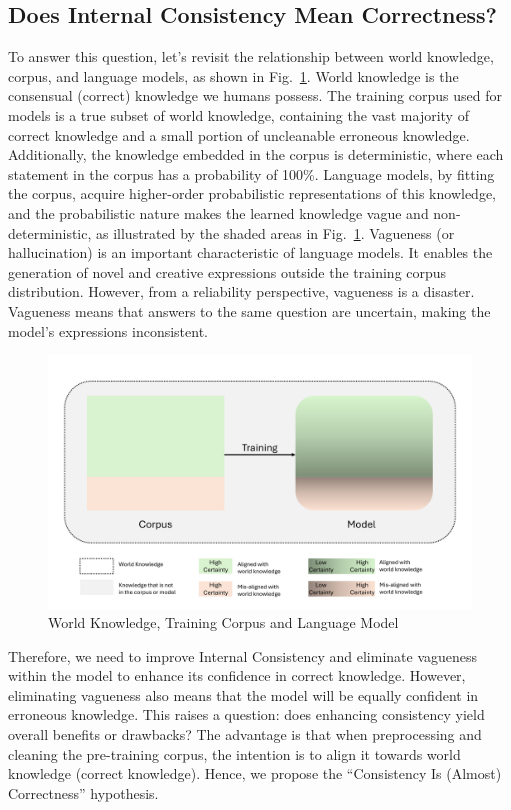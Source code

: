 \documentclass[lettersize,journal]{IEEEtran}
\begin{document}
\subsection{Does Internal Consistency Mean Correctness?}


\noindent To answer this question, let's revisit the relationship between world knowledge, corpus, and language models, as shown in Fig.~\ref{fig:knowledge}. World knowledge is the consensual (correct) knowledge we humans possess. The training corpus used for models is a true subset of world knowledge, containing the vast majority of correct knowledge and a small portion of uncleanable erroneous knowledge. Additionally, the knowledge embedded in the corpus is deterministic, where each statement in the corpus has a probability of 100\%. Language models, by fitting the corpus, acquire higher-order probabilistic representations of this knowledge, and the probabilistic nature makes the learned knowledge vague and non-deterministic, as illustrated by the shaded areas in Fig.~\ref{fig:knowledge}. Vagueness (or hallucination) is an important characteristic of language models. It enables the generation of novel and creative expressions outside the training corpus distribution. However, from a reliability perspective, vagueness is a disaster. Vagueness means that answers to the same question are uncertain, making the model's expressions inconsistent.


\begin{figure}[h!]
    \centering
    \includegraphics[width=\linewidth]{figures/knowledge.pdf}
    \caption{World Knowledge, Training Corpus and Language Model}
    \label{fig:knowledge}
\end{figure}

Therefore, we need to improve Internal Consistency and eliminate vagueness within the model to enhance its confidence in correct knowledge. However, eliminating vagueness also means that the model will be equally confident in erroneous knowledge. This raises a question: does enhancing consistency yield overall benefits or drawbacks? The advantage is that when preprocessing and cleaning the pre-training corpus, the intention is to align it towards world knowledge (correct knowledge). Hence, we propose the ``Consistency Is (Almost) Correctness'' hypothesis.
\end{document}
